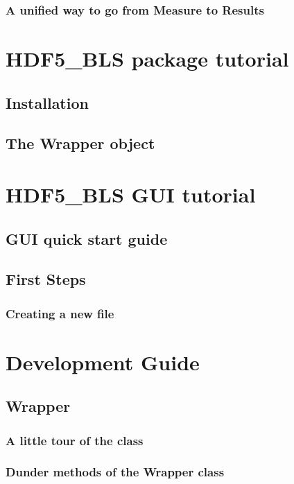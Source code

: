 \documentclass{book}
\newcommand{\mypart}[1]{\setcounter{chapter}{0} \part{#1}}
\begin{document}
    \section*{A unified way to go from Measure to Results}
        


\mypart{HDF5\_BLS package tutorial}\label{chapter:tutorial}
    \chapter{Installation}
        
        
    \chapter{The Wrapper object}
        


\mypart{HDF5\_BLS GUI tutorial}
    \chapter{GUI quick start guide}
        

    \chapter{First Steps}
        \section{Creating a new file}
            



\mypart{Development Guide} \label{chapter:dev_guide}
    \chapter{Wrapper}\label{sec:wrapper}
        \section{A little tour of the class}
            
        
        \section{Dunder methods of the Wrapper class}
            
\end{document}
